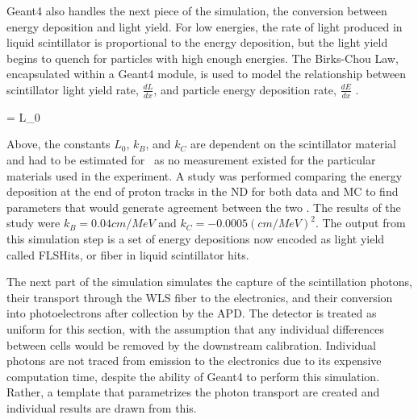 Geant4 also handles the next piece of the simulation, the conversion between energy deposition and light yield. For low energies, the rate of light produced in liquid scintillator is proportional to the energy deposition, but the light yield begins to quench for particles with high enough energies. The Birks-Chou Law, encapsulated within a Geant4 module, is used to model the relationship between scintillator light yield rate, $\frac{dL}{dx}$, and particle energy deposition rate, $\frac{dE}{dx}$ \cite{ref:BirksChou}.

\beq
{} = L_0  
\label{eq:BirksChou}
\eeq

\n Above, the constants $L_0$, $k_B$, and $k_C$ are dependent on the scintillator material and had to be estimated for \nova~as no measurement existed for the particular materials used in the experiment. A study was performed comparing the energy deposition at the end of proton tracks in the ND for both data and MC to find parameters that would generate agreement between the two \cite{ref:DanBirks}. The results of the study were $k_B = 0.04\unit{cm/MeV}$ and $k_C = -0.0005\unit{(cm/MeV)}^2$. The output from this simulation step is a set of energy depositions now encoded as light yield called FLSHits, or fiber in liquid scintillator hits.


The next part of the simulation simulates the capture of the scintillation photons, their transport through the WLS fiber to the electronics, and their conversion into photoelectrons after collection by the APD. The detector is treated as uniform for this section, with the assumption that any individual differences between cells would be removed by the downstream calibration. Individual photons are not traced from emission to the electronics due to its expensive computation time, despite the ability of Geant4 to perform this simulation. Rather, a template that parametrizes the photon transport are created and individual results are drawn from this.

